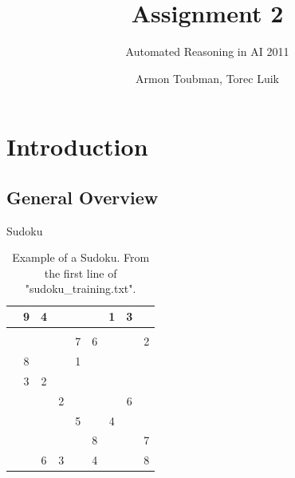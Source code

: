 \documentclass{beamer}
\title{Assignment 2}
\subtitle
{Automated Reasoning in AI 2011} %
\author{Armon Toubman, Torec Luik}
\begin{document}
\begin{frame}
  \titlepage
\end{frame}





\section{Introduction}

\subsection[General]{General Overview}

\begin{frame}{Sudoku}

\begin{table}[htbp]
\caption{Example of a Sudoku. From the first line of "sudoku\_training.txt". }
    \label{tab:sudoku_initial}
        \begin{tabular}{||c|c|c||c|c|c||c|c|c||}
        \hline
        \hline
         & 9 & 4 &  &  &  & 1 & 3 & \\
        \hline
         &  &  &  &  &  &  &  & \\
        \hline
         &  &  &  & 7 & 6 &  &  & 2\\
        \hline
        \hline
         & 8 &  &  & 1 &  &  &  & \\
        \hline
         & 3 & 2 &  &  &  &  &  & \\
        \hline
         &  &  & 2 &  &  &  & 6 & \\
        \hline
        \hline
         &  &  &  & 5 &  & 4 &  & \\
        \hline
         &  &  &  &  & 8 &  &  & 7\\
        \hline
         &  & 6 & 3 &  & 4 &  &  & 8\\
        \hline
        \hline
        \end{tabular}
    \end{table}
\end{frame}
\end{document}
